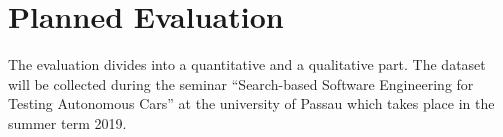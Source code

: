 \section{Planned Evaluation}
The evaluation divides into a quantitative and a qualitative part.
The dataset will be collected during the seminar ``Search-based Software Engineering for Testing Autonomous Cars'' at the university of Passau which takes place in the summer term 2019.

%
%
%
%
%
%
%

